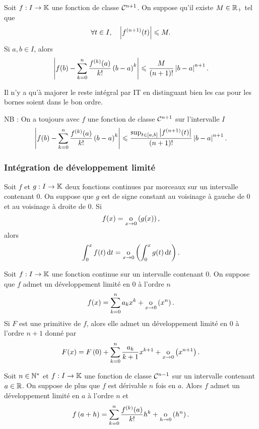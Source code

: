 \documentclass{magnolia}
\begin{document}
\begin{proposition}[utile=3, nom=Inégalité de \nom{Taylor-Lagrange}]
Soit $f:I\to\mathbb{K}$ une fonction de classe $\mathcal{C}^{n+1}$. On
suppose qu'il existe $M\in\mathbb{R}_+$ tel que
\[\forall t\in I ,\quad \left|f^{(n+1)}(t)\right|\leqslant M.\]
Si $a,b\in I$, alors
  \[\left|f(b)-\sum_{k=0}^n \frac{f^{(k)}(a)}{k!}\left(b-a\right)^k\right|\leqslant
  \frac{M}{\left(n+1\right)!}\left|b-a\right|^{n+1}.\]
\end{proposition}

\begin{preuve}
Il n'y a qu'à majorer le reste intégral par IT en distinguant bien les cas pour les bornes soient dans le bon ordre.
\end{preuve}

\begin{sol}
NB : On a toujours avec $f$ une fonction de classe $\mathcal{C}^{n+1}$ sur l'intervalle $I$ $$\left|f(b)-\sum_{k=0}^n \frac{f^{(k)}(a)}{k!}\left(b-a\right)^k\right|\leqslant
  \frac{\sup_{t\in\left[a,b\right]}\left|f^{(n+1)}(t)\right|}{\left(n+1\right)!}\left|b-a\right|^{n+1}.$$
\end{sol}
\subsubsection{Intégration de développement limité}
\begin{proposition}[utile=1]
Soit $f$ et $g:I\to\mathbb{K}$ deux fonctions continues par morceaux sur un intervalle
contenant $0$. On suppose que $g$ est de signe constant au voisinage à gauche
de $0$ et au voisinage à droite de $0$. Si
\[f(x)=\underset{x \rightarrow 0}{\text{o}}\left(g(x)\right),\]
alors
\[\int_{0}^{x} f(t)\,\text{d}t=\underset{x \rightarrow 0}{\text{o}}\left(\int_{0}^{x} g(t)\,\text{d}t\right).\]
\end{proposition}

\begin{proposition}[utile=3]
Soit $f:I\to\mathbb{K}$ une fonction continue sur un intervalle contenant $0$. On
suppose que $f$ admet un développement limité en $0$ à l'ordre $n$
\[f(x)=\sum_{k=0}^n a_k x^k+\underset{x \rightarrow 0}{\text{o}}\left(x^n\right).\]
Si $F$ est une primitive de $f$, alors elle admet un développement limité en 0 à
l'ordre $n+1$ donné par
\[F(x)=F\left(0\right)+\sum_{k=0}^n \frac{a_k}{k+1} x^{k+1}+
                          \underset{x \rightarrow 0}{\text{o}}\left(x^{n+1}\right).\]
\end{proposition}

\begin{proposition}[utile=-3, nom=Formule de \nom{Taylor-Young}]
Soit $n\in{\mathbb{N}^*}$ et $f:I\to\mathbb{K}$ une fonction de classe $\mathcal{C}^{n-1}$ sur un intervalle contenant $a\in\mathbb{R}$. On suppose de plus que $f$ est
dérivable $n$ fois en $a$. Alors $f$ admet un développement limité en $a$ à
l'ordre $n$ et
\[f\left(a+h\right)=\sum_{k=0}^n \frac{f^{(k)}(a)}{k!}h^k+\underset{h \rightarrow 0}{\text{o}}\left(h^n\right).\]
\end{proposition}
\end{document}
